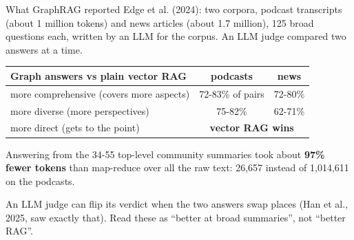 \documentclass[aspectratio=169]{beamer}
\newcommand{\watchbox}[1]{%
  \begin{tcolorbox}[colback=armorange!12, colframe=armorange, boxrule=0.6pt, arc=2pt]
  #1
  \end{tcolorbox}}
\begin{document}
\begin{frame}{What GraphRAG reported}
  \vspace{0.1em}
  {\small Edge et al. (2024): two corpora, podcast transcripts (about 1 million tokens) and news
  articles (about 1.7 million), 125 broad questions each, written by an LLM for the corpus.
  An LLM judge compared two answers at a time.}

  \vspace{0.3em}
  \begin{center}
  \small
  \begin{tabular}{lcc}
    \toprule
    \textbf{Graph answers vs plain vector RAG} & \textbf{podcasts} & \textbf{news} \\
    \midrule
    more comprehensive (covers more aspects)  & 72-83\% of pairs & 72-80\% \\
    more diverse (more perspectives)          & 75-82\%          & 62-71\% \\
    more direct (gets to the point)           & \multicolumn{2}{c}{\textbf{vector RAG wins}} \\
    \bottomrule
  \end{tabular}
  \end{center}

  \vspace{0.3em}
  {\small Answering from the 34-55 top-level community summaries took about \textbf{97\% fewer
  tokens} than map-reduce over all the raw text: 26{,}657 instead of 1{,}014{,}611 on the
  podcasts.}

  \vspace{0.2em}
  \watchbox{\small An LLM judge can flip its verdict when the two answers swap places (Han et al.,
  2025, saw exactly that). Read these as ``better at broad summaries'', not ``better RAG''.}
\end{frame}
\end{document}
